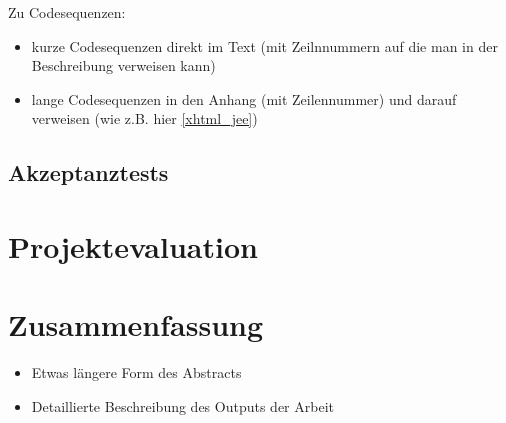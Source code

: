 

Zu Codesequenzen:
\begin{itemize}
	\item kurze Codesequenzen direkt im Text (mit Zeilnnummern auf die man in der Beschreibung verweisen kann)
	\item lange Codesequenzen in den Anhang (mit Zeilennummer) und darauf verweisen (wie z.B. hier \cref{xhtml_jee})
\end{itemize}

\section{Akzeptanztests}

\chapter{Projektevaluation}



\chapter{Zusammenfassung}
\begin{itemize}
	\item Etwas längere Form des Abstracts
	\item Detaillierte Beschreibung des Outputs der Arbeit
	
	
\end{itemize}